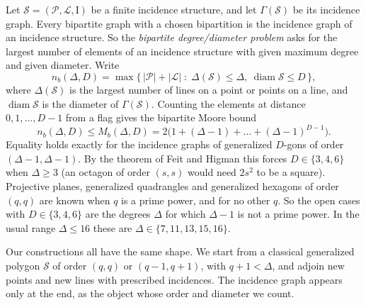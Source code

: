 \documentclass[11pt]{amsart}
\theoremstyle{definition}
\theoremstyle{remark}
\newcommand{\cS}{\mathcal{S}}
\newcommand{\cP}{\mathcal{P}}
\newcommand{\cL}{\mathcal{L}}
\newcommand{\I}{\mathrel{\mathrm{I}}}
\newcommand{\diam}{\operatorname{diam}}
\begin{document}
Let $\cS=(\cP,\cL,\I)$ be a finite incidence structure, and let $\Gamma(\cS)$ be its incidence graph. Every bipartite graph with a chosen bipartition is the incidence graph of an incidence structure. So the \emph{bipartite degree/diameter problem} asks for the largest number of elements of an incidence structure with given maximum degree and given diameter. Write
\[
n_b(\Delta,D)=\max\bigl\{\,|\cP|+|\cL| \;:\; \Delta(\cS)\le\Delta,\ \diam\cS\le D\,\bigr\},
\]
where $\Delta(\cS)$ is the largest number of lines on a point or points on a line, and $\diam\cS$ is the diameter of $\Gamma(\cS)$.
Counting the elements at distance $0,1,\dots,D-1$ from a flag gives the bipartite Moore bound
\[
n_b(\Delta,D)\le M_b(\Delta,D)=2\bigl(1+(\Delta-1)+\dots+(\Delta-1)^{D-1}\bigr).
\]
Equality holds exactly for the incidence graphs of generalized $D$-gons of order $(\Delta-1,\Delta-1)$. By the theorem of Feit and Higman \cite{FH64} this forces $D\in\{3,4,6\}$ when $\Delta\ge 3$ (an octagon of order $(s,s)$ would need $2s^2$ to be a square). Projective planes, generalized quadrangles and generalized hexagons of order $(q,q)$ are known when $q$ is a prime power, and for no other $q$. So the open cases with $D\in\{3,4,6\}$ are the degrees $\Delta$ for which $\Delta-1$ is not a prime power. In the usual range $\Delta\le16$ these are $\Delta\in\{7,11,13,15,16\}$.

Our constructions all have the same shape. We start from a classical generalized polygon $\cS$ of order $(q,q)$ or $(q-1,q+1)$, with $q+1<\Delta$, and adjoin new points and new lines with prescribed incidences. The incidence graph appears only at the end, as the object whose order and diameter we count.
\end{document}
